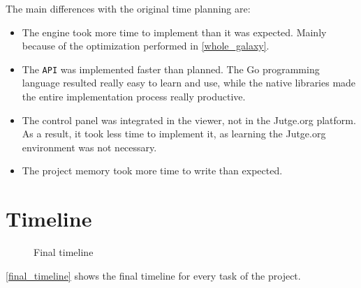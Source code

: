 \documentclass[a4paper,11pt,titlepage,abstract,numbers=noenddot,automark,mnsy,intlimits,rgb,dvipsnames]{report}
\begin{document}
The main differences with the original time planning are:
\begin{itemize}
\item
The engine took more time to implement than it was expected. Mainly because of the optimization
  performed in \autoref{whole_galaxy}.
\item
The \texttt{API} was implemented faster than planned. The Go programming language resulted really easy to
  learn and use, while the native libraries made the entire implementation process really productive.
\item
The control panel was integrated in the viewer, not in the Jutge.org platform. As a result,
  it took less time to implement it, as learning the Jutge.org environment was not necessary.
\item
The project memory took more time to write than expected.
\end{itemize}
\section{Timeline}
\begin{figure}[H]
\caption{Final timeline}
\label{final_timeline}
\end{figure}
\autoref{final_timeline} shows the final timeline for every task of the project.
\end{document}
